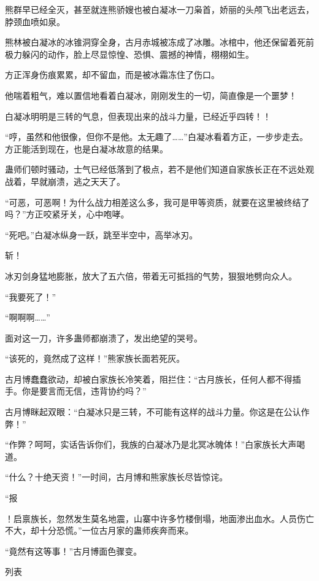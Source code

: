 \begin{this_body}
熊群早已经全灭，甚至就连熊骄嫂也被白凝冰一刀枭首，娇丽的头颅飞出老远去，脖颈血喷如泉。

熊林被白凝冰的冰锥洞穿全身，古月赤城被冻成了冰雕。冰棺中，他还保留着死前极力躲闪的动作，脸上尽显惊惶、恐惧、震撼的神情，栩栩如生。

方正浑身伤痕累累，却不留血，而是被冰霜冻住了伤口。

他喘着粗气，难以置信地看着白凝冰，刚刚发生的一切，简直像是一个噩梦！

白凝冰明明是三转的气息，但表现出来的战斗力量，已经近乎四转！！

“哼，虽然和他很像，但你不是他。太无趣了……”白凝冰看着方正，一步步走去。方正能活到现在，也是白凝冰故意的结果。

蛊师们顿时骚动，士气已经低落到了极点，若不是他们知道自家族长正在不远处观战着，早就崩溃，逃之天天了。

“可恶，可恶啊！为什么战力相差这么多，我可是甲等资质，就要在这里被终结了吗？”方正咬紧牙关，心中咆哮。

“死吧。”白凝冰纵身一跃，跳至半空中，高举冰刃。

斩！

冰刃剑身猛地膨胀，放大了五六倍，带着无可抵挡的气势，狠狠地劈向众人。

“我要死了！”

“啊啊啊……”

面对这一刀，许多蛊师都崩溃了，发出绝望的哭号。

“该死的，竟然成了这样！”熊家族长面若死灰。

古月博蠢蠢欲动，却被白家族长冷笑着，阻拦住：“古月族长，任何人都不得插手。你是要言而无信，违背协约吗？”

古月博眯起双眼：“白凝冰只是三转，不可能有这样的战斗力量。你这是在公认作弊！”

“作弊？呵呵，实话告诉你们，我族的白凝冰乃是北冥冰魄体！”白家族长大声喝道。

“什么？十绝天资！”一时间，古月博和熊家族长尽皆惊诧。

“报

！启禀族长，忽然发生莫名地震，山寨中许多竹楼倒塌，地面渗出血水。人员伤亡不大，却十分恐慌。”一位古月家的蛊师疾奔而来。

“竟然有这等事！”古月博面色骤变。

列表

\end{this_body}

